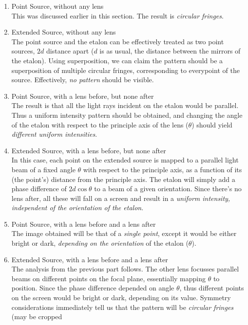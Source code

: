 \begin{enumerate}
\item Point Source, without any lens\\
This was discussed earlier in this section. The result is \emph{circular
fringes}.
\item Extended Source, without any lens\\
The point source and the etalon can be effectively treated as two
point sources, $2d$ distance apart ($d$ is as usual, the distance
between the mirrors of the etalon). Using superposition, we can claim
the pattern should be a superposition of multiple circular fringes,
corresponding to everypoint of the source. Effectively, \emph{no pattern}
should be visible.
\item Point Source, with a lens before, but none after\\
The result is that all the light rays incident on the etalon would
be parallel. Thus a uniform intensity pattern should be obtained,
and changing the angle of the etalon with respect to the principle
axis of the lens ($\theta$) should yield \emph{different uniform
intensities}.
\item Extended Source, with a lens before, but none after\\
In this case, each point on the extended source is mapped to a parallel
light beam of a fixed angle $\theta$ with respect to the principle
axis, as a function of its (the point's) distance from the principle
axis. The etalon will simply add a phase difference of $2d\cos\theta$
to a beam of a given orientation. Since there's no lens after, all
these will fall on a screen and result in a \emph{uniform intensity,
independent of the orientation of the etalon}.
\item Point Source, with a lens before and a lens after\\
The image obtained will be that of a \emph{single point}, except it
would be either bright or dark, \emph{depending on the orientation}
of the etalon ($\theta$).
\item Extended Source, with a lens before and a lens after\\
The analysis from the previous part follows. The other lens focusses
parallel beams on different points on the focal plane, essentially
mapping $\theta$ to position. Since the phase difference depended
on angle $\theta$, thus different points on the screen would be bright
or dark, depending on its value. Symmetry considerations immediately
tell us that the pattern will be \emph{circular fringes} (may be cropped

\end{enumerate}
